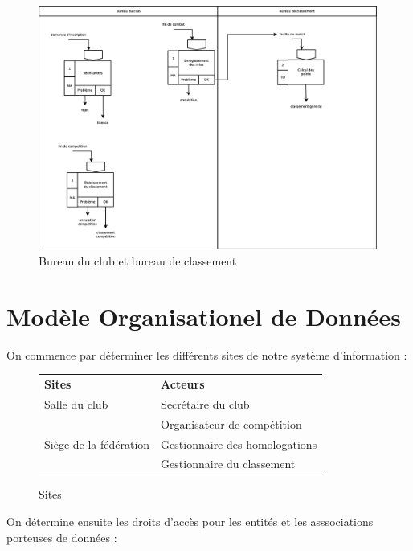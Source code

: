 \begin{figure}[!htb]
    \begin{center}
    \includegraphics[height=8cm]{images/cc2_mot2.eps}
    \caption{\label{cc2_mot2} Bureau du club et bureau de classement}
    \end{center}
\end{figure}


\newpage
\section*{Modèle Organisationel de Données}

On commence par déterminer les différents sites de notre système d'information :\\

\begin{figure}[!h]
\begin{tabular}{l l}
%
    \textbf{Sites}         & \textbf{Acteurs} \\
    Salle du club          & Secrétaire du club \\
                           & Organisateur de compétition \\
    Siège de la fédération & Gestionnaire des homologations \\
                           & Gestionnaire du classement \\
%
\end{tabular}
    \caption{\label{sites} Sites}
\end{figure}

\newpage
On détermine ensuite les droits d'accès pour les entités et les asssociations porteuses de données :\\

